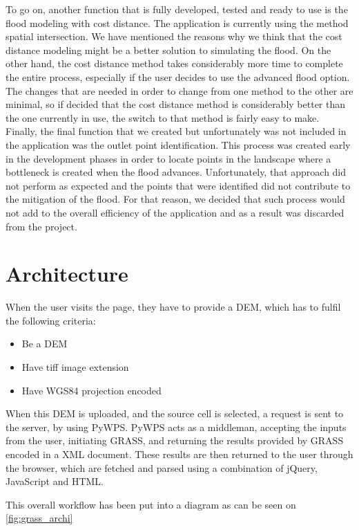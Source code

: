To go on, another function that is fully developed, tested and ready to use is the flood modeling with cost distance. The application is currently using the method spatial intersection. We have mentioned the reasons why we think that the cost distance modeling might be a better solution to simulating the flood. On the other hand, the cost distance method takes considerably more time to complete the entire process, especially if the user decides to use the advanced flood option. The changes that are needed in order to change from one method to the other are minimal, so if decided that the cost distance method is considerably better than the one currently in use, the switch to that method is fairly easy to make. \\  
Finally, the final function that we created but unfortunately was not included in the application was the outlet point identification. This process was created early in the development phases in order to locate points in the landscape where a bottleneck is created when the flood advances. Unfortunately, that approach did not perform as expected and the points that were identified did not contribute to the mitigation of the flood. For that reason, we decided that such process would not add to the overall efficiency of the application and as a result was discarded from the project.

\section{Architecture}
When the user visits the page, they have to provide a DEM, which has to fulfil the following criteria:

\begin{itemize}
\item Be a DEM
\item Have tiff image extension
\item Have WGS84 projection encoded
\end{itemize}

When this DEM is uploaded, and the source cell is selected, a request is sent to the server, by using PyWPS. PyWPS acts as a middleman, accepting the inputs from the user, initiating GRASS, and returning the results provided by GRASS encoded in a XML document. These results are then returned to the user through the browser, which are fetched and parsed using a combination of jQuery, JavaScript and HTML.

This overall workflow has been put into a diagram as can be seen on \autoref{fig:grass_archi}

